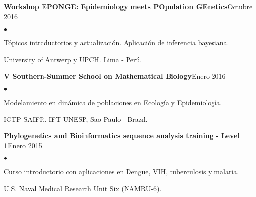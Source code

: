 \documentclass[margin,line]{res}
\newenvironment{list2}{
	\begin{list}{$\bullet$}{%
			\setlength{\itemsep}{0in}
			\setlength{\parsep}{0in} \setlength{\parskip}{0in}
			\setlength{\topsep}{0in} \setlength{\partopsep}{0in}
			\setlength{\leftmargin}{0.2in}}}{\end{list}}
\begin{document}
\begin{resume}
		{\bf Workshop EPONGE: Epidemiology meets POpulation GEnetics}\hfill {Octubre 2016}\\
		\vspace*{-.1in}
		\begin{list2} %
			\item Tópicos introductorios y actualización. Aplicación de inferencia bayesiana.
			\item University of Antwerp y UPCH. Lima - Perú.
		\end{list2}

		
		{\bf V Southern-Summer School on Mathematical Biology}\hfill {Enero 2016}\\
		\vspace*{-.1in}%
		\begin{list2} %
			\item Modelamiento en dinámica de poblaciones en Ecología y Epidemiología.
			\item ICTP-SAIFR. IFT-UNESP, Sao Paulo - Brazil.
		\end{list2}
		
		{\bf Phylogenetics and Bioinformatics sequence analysis training - Level 1}\hfill {Enero 2015}\\
		\vspace*{-.1in}
		\begin{list2} %
			\item Curso introductorio con aplicaciones en Dengue, VIH, tuberculosis y malaria.
			\item U.S. Naval Medical Research Unit Six (NAMRU-6).%
		\end{list2}
		

\end{resume}
\end{document}
